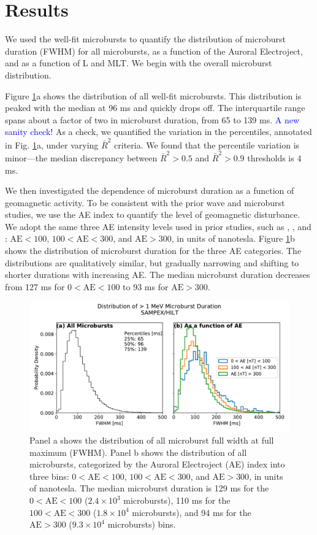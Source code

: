 \documentclass[draft]{agujournal2019}
\begin{document}
\section{Results}\label{results}
We used the well-fit microbursts to quantify the distribution of microburst duration (FWHM) for all microbursts, as a function of the Auroral Electroject, and as a function of L and MLT. We begin with the overall microburst distribution.

Figure \ref{fig2}a shows the distribution of all well-fit microbursts. This distribution is peaked with the median at 96 ms and quickly drops off. The interquartile range spans about a factor of two in microburst duration, from 65 to 139 ms. \textcolor{blue}{A new sanity check!} As a check, we quantified the variation in the percentiles, annotated in Fig. \ref{fig2}a, under varying $\bar{R}^2$ criteria. We found that the percentile variation is minor---the median discrepancy between $\bar{R}^2 > 0.5$ and $\bar{R}^2 > 0.9$ thresholds is $4$ ms.

We then investigated the dependence of microburst duration as a function of geomagnetic activity. To be consistent with the prior wave and microburst studies, we use the AE index to quantify the level of geomagnetic disturbance. We adopt the same three AE intensity levels used in prior studies, such as , , and : $\mathrm{AE} < 100$, $100 < \mathrm{AE} < 300$, and $\mathrm{AE} > 300$, in units of nanotesla. Figure \ref{fig2}b shows the distribution of microburst duration for the three AE categories. The distributions are qualitatively similar, but gradually narrowing and shifting to shorter durations with increasing AE. The median microburst duration decreases from 127 ms for $0 < \mathrm{AE} < 100$ to 93 ms for $ \mathrm{AE} > 300$.

\begin{figure}
\noindent\includegraphics[width=\textwidth]{figures/fig2.pdf}
\caption{Panel a shows the distribution of all microburst full width at full maximum (FWHM). Panel b shows the distribution of all microbursts, categorized by the Auroral Electroject (AE) index into three bins: $0 < \mathrm{AE} < 100$, $100 < \mathrm{AE} < 300$, and $\mathrm{AE} > 300$, in units of nanotesla. The median microburst duration is 129 ms for the $0 < \mathrm{AE} < 100$ ($2.4\times 10^{3}$ microbursts), 110 ms for the $100 < \mathrm{AE} < 300$ ($1.8\times 10^{4}$ microbursts), and 94 ms for the $ \mathrm{AE} > 300$ ($9.3\times 10^{4}$ microbursts) bins.}
\label{fig2}
\end{figure}
\end{document}
